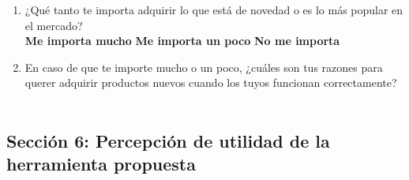 \begin{enumerate}[resume]
    \item ¿Qué tanto te importa adquirir lo que está de novedad o es lo más
    popular en el mercado? \\
    \textbf{Me importa mucho} \quad \textbf{Me importa un poco} \quad \textbf{No
    me importa}

    \item En caso de que te importe mucho o un poco, ¿cuáles son tus razones
    para querer adquirir productos nuevos cuando los tuyos funcionan
    correctamente? \\
    \underline{\hspace{\linewidth}} \\
    \underline{\hspace{\linewidth}}

\end{enumerate}

\subsection*{Sección 6: Percepción de utilidad de la herramienta propuesta}

